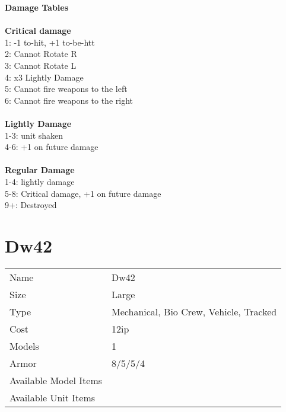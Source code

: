 {\bf Damage Tables} \\
\ \\ {\bf Critical damage } \\
1: -1 to-hit, +1 to-be-htt \\
2: Cannot Rotate R \\
3: Cannot Rotate L \\
4: x3 Lightly Damage \\
5: Cannot fire weapons to the left \\
6: Cannot fire weapons to the right \\
\ \\ {\bf Lightly Damage } \\
1-3: unit shaken \\
4-6: +1 on future damage \\
\ \\ {\bf Regular Damage } \\
1-4: lightly damage \\
5-8: Critical damage, +1 on future damage \\
9+: Destroyed \\









\pagebreak

\section{ Dw42 }

\begin{tabular}{ll}
  Name & Dw42 \\
  Size & Large\\
  Type & Mechanical, Bio Crew, Vehicle, Tracked\\
  Cost & 12ip\\
  Models & 1\\
  Armor & 8/5/5/4\\
  Available Model Items &  \\
  Available Unit Items &  \\
\end{tabular}

